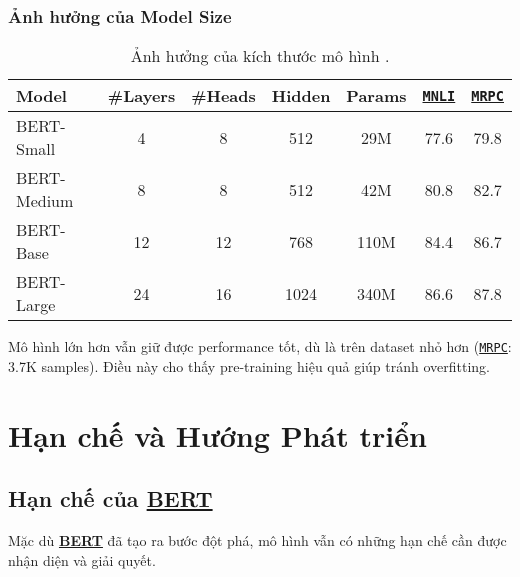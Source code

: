 \subsubsection{Ảnh hưởng của Model Size}
\begin{table}[H]
    \centering
    \caption{Ảnh hưởng của kích thước mô hình \cite{devlin2018bert}.}
    \label{tab:model_size_effect}
    \begin{tabular}{lcccccc}
        \toprule
        \textbf{Model} & \textbf{\#Layers} & \textbf{\#Heads} & \textbf{Hidden} & \textbf{Params} & \textbf{\hyperref[acro:mnli]{\texttt{MNLI}}} & \textbf{\hyperref[acro:mrpc]{\texttt{MRPC}}} \\
        \midrule
        BERT-Small & 4 & 8 & 512 & 29M & 77.6 & 79.8 \\
        BERT-Medium & 8 & 8 & 512 & 42M & 80.8 & 82.7 \\
        BERT-Base & 12 & 12 & 768 & 110M & 84.4 & 86.7 \\
        BERT-Large & 24 & 16 & 1024 & 340M & 86.6 & 87.8 \\
        \bottomrule
    \end{tabular}
\end{table}

Mô hình lớn hơn vẫn giữ được performance tốt, dù là trên dataset nhỏ hơn (\hyperref[acro:mrpc]{\texttt{MRPC}}: 3.7K samples). Điều này cho thấy pre-training hiệu quả giúp tránh overfitting.

\section{Hạn chế và Hướng Phát triển}
\label{sec:han_che_huong_phat_trien}

\subsection{Hạn chế của \hyperref[acro:bert]{\textbf{BERT}}}
\label{ssec:han_che_bert}

Mặc dù \hyperref[acro:bert]{\textbf{BERT}} đã tạo ra bước đột phá, mô hình vẫn có những hạn chế cần được nhận diện và giải quyết.

